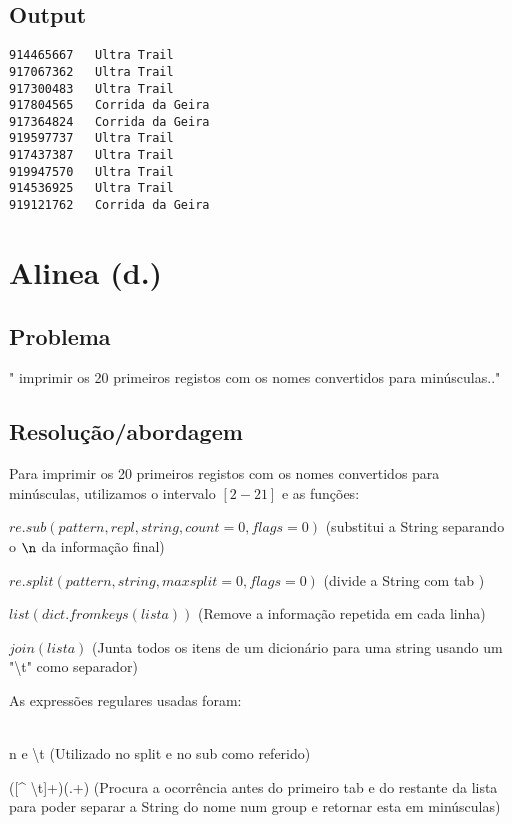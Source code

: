 \documentclass[11pt,a4paper]{report}
\begin{document}
\pagebreak

    \subsection{Output}

	\begin{verbatim}
914465667 	Ultra Trail	
917067362 	Ultra Trail	
917300483 	Ultra Trail	
917804565 	Corrida da Geira	
917364824 	Corrida da Geira	
919597737 	Ultra Trail	
917437387 	Ultra Trail	
919947570 	Ultra Trail	
914536925 	Ultra Trail	
919121762 	Corrida da Geira	
    \end{verbatim}
    
    
\pagebreak

    \section{Alinea (d.)}
	\subsection{Problema}
	" imprimir os 20 primeiros registos com os nomes convertidos para minúsculas.."
	
	\subsection{Resolução/abordagem}
	Para imprimir os 20 primeiros registos com os nomes convertidos para minúsculas, utilizamos o intervalo $[2-21]$ e as funções:

$re.sub(pattern,repl,string,count=0,flags=0)$ (substitui a String separando o  $\n$  da informação final)

$re.split(pattern,string,maxsplit=0,flags=0)$  (divide a String com  tab )

$list(dict.fromkeys(lista))$  (Remove a informação repetida em cada linha)

$join(lista)$ (Junta todos os itens de um dicionário para uma string usando um "\textbackslash t" como separador)

As expressões regulares usadas foram:

\\n e \textbackslash t (Utilizado no split e no sub como referido)

([\^{} \textbackslash t]+)(.+) (Procura a ocorrência antes do primeiro  tab  e do restante da lista para poder separar a String do nome num group e retornar esta em minúsculas)
    
	
\end{document}
